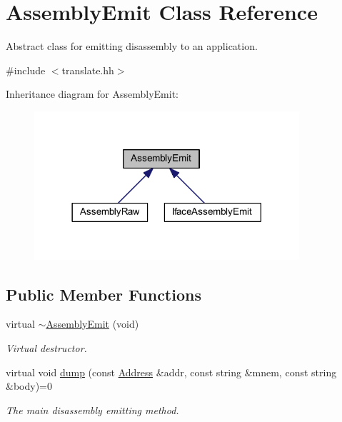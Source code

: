 \hypertarget{class_assembly_emit}{}\section{Assembly\+Emit Class Reference}
\label{class_assembly_emit}


Abstract class for emitting disassembly to an application.  




{\ttfamily \#include $<$translate.\+hh$>$}



Inheritance diagram for Assembly\+Emit\+:
\nopagebreak
\begin{figure}[H]
\begin{center}
\leavevmode
\includegraphics[width=278pt]{class_assembly_emit__inherit__graph}
\end{center}
\end{figure}
\subsection*{Public Member Functions}
\begin{DoxyCompactItemize}
\item 
virtual \mbox{\hyperlink{class_assembly_emit_aa5cf778a309d1b52a4be31ea745ad5af}{$\sim$\+Assembly\+Emit}} (void)
\begin{DoxyCompactList}\small\item\em Virtual destructor. \end{DoxyCompactList}\item 
virtual void \mbox{\hyperlink{class_assembly_emit_afdb4c90bde30480659ad4eaa49bd1487}{dump}} (const \mbox{\hyperlink{class_address}{Address}} \&addr, const string \&mnem, const string \&body)=0
\begin{DoxyCompactList}\small\item\em The main disassembly emitting method. \end{DoxyCompactList}\end{DoxyCompactItemize}


